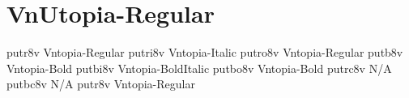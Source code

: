\documentclass[sample]{vnsample}
\begin{document}
\section{VnUtopia-Regular}
  {putr8v}   {Vntopia-Regular}
 {putri8v}  {Vntopia-Italic}
 {putro8v}  {Vntopia-Regular}
  {putb8v}   {Vntopia-Bold}
 {putbi8v}  {Vntopia-BoldItalic}
 {putbo8v}  {Vntopia-Bold}
 {putrc8v}  {N/A}
 {putbc8v}  {N/A}
  {putr8v}   {Vntopia-Regular}
\end{document}
